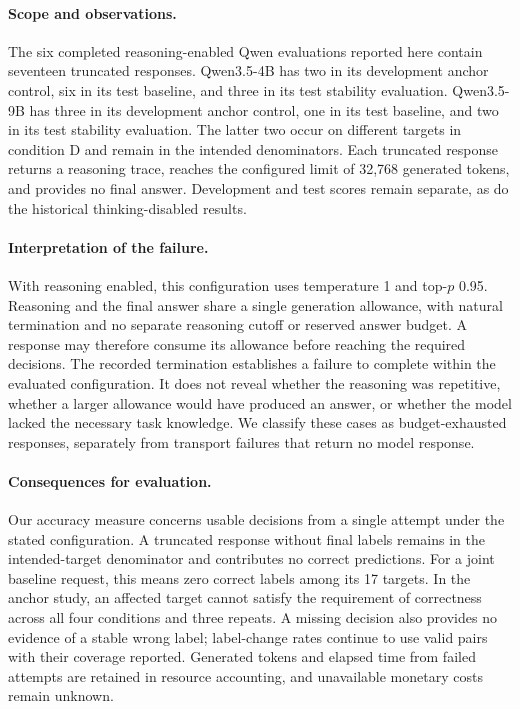 \documentclass{article}
\begin{document}
\paragraph{Scope and observations.}
The six completed reasoning-enabled Qwen evaluations reported here contain seventeen truncated responses. Qwen3.5-4B has two in its development anchor control, six in its test baseline, and three in its test stability evaluation. Qwen3.5-9B has three in its development anchor control, one in its test baseline, and two in its test stability evaluation. The latter two occur on different targets in condition D and remain in the intended denominators. Each truncated response returns a reasoning trace, reaches the configured limit of 32,768 generated tokens, and provides no final answer. Development and test scores remain separate, as do the historical thinking-disabled results.

\paragraph{Interpretation of the failure.}
With reasoning enabled, this configuration uses temperature 1 and top-$p$ 0.95. Reasoning and the final answer share a single generation allowance, with natural termination and no separate reasoning cutoff or reserved answer budget. A response may therefore consume its allowance before reaching the required decisions. The recorded termination establishes a failure to complete within the evaluated configuration. It does not reveal whether the reasoning was repetitive, whether a larger allowance would have produced an answer, or whether the model lacked the necessary task knowledge. We classify these cases as budget-exhausted responses, separately from transport failures that return no model response.

\paragraph{Consequences for evaluation.}
Our accuracy measure concerns usable decisions from a single attempt under the stated configuration. A truncated response without final labels remains in the intended-target denominator and contributes no correct predictions. For a joint baseline request, this means zero correct labels among its 17 targets. In the anchor study, an affected target cannot satisfy the requirement of correctness across all four conditions and three repeats. A missing decision also provides no evidence of a stable wrong label; label-change rates continue to use valid pairs with their coverage reported. Generated tokens and elapsed time from failed attempts are retained in resource accounting, and unavailable monetary costs remain unknown.
\end{document}
